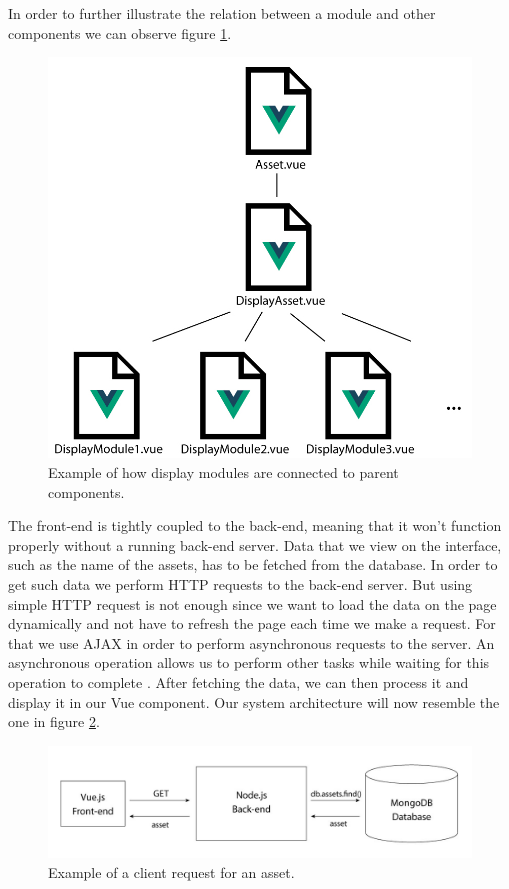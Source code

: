 In order to further illustrate the relation between a module and other components we can observe figure \ref{frontendStructure}.

\begin{figure}[h!]
    \centering
    \includegraphics[scale=0.23]{images/Frontend/frontendStructure.jpg}
    \caption[Front-end file structure]{Example of how display modules are connected to parent components.}
    \label{frontendStructure}
\end{figure}

The front-end is tightly coupled to the back-end, meaning that it won't function properly without a running back-end server. Data that we view on the interface, such as the name of the assets, has to be fetched from the database. In order to get such data we perform HTTP requests to the back-end server. But using simple HTTP request is not enough since we want to load the data on the page dynamically and not have to refresh the page each time we make a request. For that we use AJAX in order to perform asynchronous requests to the server. An asynchronous operation allows us to perform other tasks while waiting for this operation to complete \cite{Gyorodi2016WebAjax}. After fetching the data, we can then process it and display it in our Vue component. Our system architecture will now resemble the one in figure \ref{exampleGET}.

\begin{figure}[h!]
    \centering
    \includegraphics[scale=0.21]{images/Frontend/getAssetExample.jpg}
    \caption[Front-end request example]{Example of a client request for an asset.}
    \label{exampleGET}
\end{figure}

